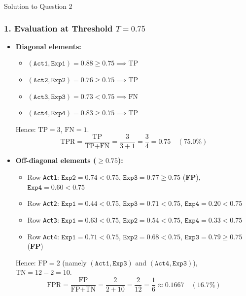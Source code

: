 \documentclass[11pt,a4paper]{article}
\begin{document}
\begin{solutionbox}{Solution to Question 2}
\subsubsection*{1. Evaluation at Threshold $T = 0.75$}
\begin{itemize}
    \item \textbf{Diagonal elements:}
    \begin{itemize}
        \item $(\texttt{Act1}, \texttt{Exp1}) = 0.88 \ge 0.75 \implies \text{TP}$
        \item $(\texttt{Act2}, \texttt{Exp2}) = 0.76 \ge 0.75 \implies \text{TP}$
        \item $(\texttt{Act3}, \texttt{Exp3}) = 0.73 < 0.75 \implies \text{FN}$
        \item $(\texttt{Act4}, \texttt{Exp4}) = 0.83 \ge 0.75 \implies \text{TP}$
    \end{itemize}
    Hence: $\text{TP} = 3$, $\text{FN} = 1$.
    \begin{equation*}
    \text{TPR} = \frac{\text{TP}}{\text{TP} + \text{FN}} = \frac{3}{3 + 1} = \frac{3}{4} = \mathbf{0.75} \quad (75.0\%)
    \end{equation*}

    \item \textbf{Off-diagonal elements ($\ge 0.75$):}
    \begin{itemize}
        \item Row \texttt{Act1}: $\texttt{Exp2} = 0.74 < 0.75$, $\texttt{Exp3} = 0.77 \ge 0.75$ (\textbf{FP}), $\texttt{Exp4} = 0.60 < 0.75$
        \item Row \texttt{Act2}: $\texttt{Exp1} = 0.44 < 0.75$, $\texttt{Exp3} = 0.71 < 0.75$, $\texttt{Exp4} = 0.20 < 0.75$
        \item Row \texttt{Act3}: $\texttt{Exp1} = 0.63 < 0.75$, $\texttt{Exp2} = 0.54 < 0.75$, $\texttt{Exp4} = 0.33 < 0.75$
        \item Row \texttt{Act4}: $\texttt{Exp1} = 0.71 < 0.75$, $\texttt{Exp2} = 0.68 < 0.75$, $\texttt{Exp3} = 0.79 \ge 0.75$ (\textbf{FP})
    \end{itemize}
    Hence: $\text{FP} = 2$ (namely $(\texttt{Act1}, \texttt{Exp3})$ and $(\texttt{Act4}, \texttt{Exp3})$), $\text{TN} = 12 - 2 = 10$.
    \begin{equation*}
    \text{FPR} = \frac{\text{FP}}{\text{FP} + \text{TN}} = \frac{2}{2 + 10} = \frac{2}{12} = \frac{1}{6} \approx \mathbf{0.1667} \quad (16.7\%)
    \end{equation*}
\end{itemize}


\end{solutionbox}
\end{document}
